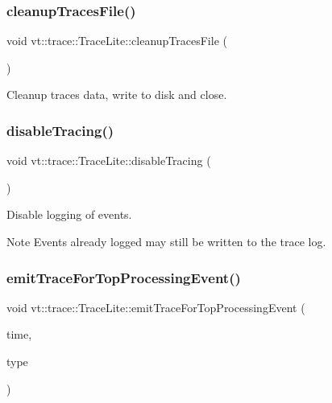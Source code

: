 \subsubsection{\texorpdfstring{cleanup\+Traces\+File()}{cleanupTracesFile()}}
{\footnotesize\ttfamily void vt\+::trace\+::\+Trace\+Lite\+::cleanup\+Traces\+File (\begin{DoxyParamCaption}{ }\end{DoxyParamCaption})}



Cleanup traces data, write to disk and close. 

\mbox{\label{structvt_1_1trace_1_1_trace_lite_ac494fd6858647fd548b6554cf066568b}} 
\subsubsection{\texorpdfstring{disable\+Tracing()}{disableTracing()}}
{\footnotesize\ttfamily void vt\+::trace\+::\+Trace\+Lite\+::disable\+Tracing (\begin{DoxyParamCaption}{ }\end{DoxyParamCaption})}



Disable logging of events. 

\begin{DoxyNote}{Note}
Events already logged may still be written to the trace log. 
\end{DoxyNote}
\mbox{\label{structvt_1_1trace_1_1_trace_lite_a0fe1ea3e54a0428639c5fe338ce9a04f}} 
\subsubsection{\texorpdfstring{emit\+Trace\+For\+Top\+Processing\+Event()}{emitTraceForTopProcessingEvent()}}
{\footnotesize\ttfamily void vt\+::trace\+::\+Trace\+Lite\+::emit\+Trace\+For\+Top\+Processing\+Event (\begin{DoxyParamCaption}\item[{\hyperlink{namespacevt_a2b9f28078dc309ad0706b69ded743e69}{Time\+Type} const}]{time,  }\item[{\hyperlink{namespacevt_1_1trace_acf454dfbd581b0ebae895f90b5927a1d}{Trace\+Constants\+Type} const}]{type }\end{DoxyParamCaption})\hspace{0.3cm}{\ttfamily [protected]}}



